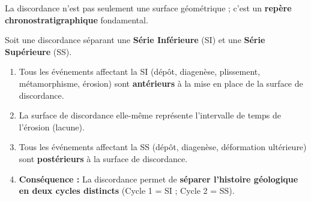 \documentclass[11pt]{article}
\begin{document}
La discordance n'est pas seulement une surface géométrique ; c'est un \textbf{repère chronostratigraphique} fondamental.

\begin{propriete}
Soit une discordance séparant une \textbf{Série Inférieure} (SI) et une \textbf{Série Supérieure} (SS).
\begin{enumerate}
    \item Tous les événements affectant la SI (dépôt, diagenèse, plissement, métamorphisme, érosion) sont \textbf{antérieurs} à la mise en place de la surface de discordance.
    \item La surface de discordance elle-même représente l'intervalle de temps de l'érosion (lacune).
    \item Tous les événements affectant la SS (dépôt, diagenèse, déformation ultérieure) sont \textbf{postérieurs} à la surface de discordance.
    \item \textbf{Conséquence :} La discordance permet de \textbf{séparer l'histoire géologique en deux cycles distincts} (Cycle 1 = SI ; Cycle 2 = SS).
\end{enumerate}
\end{propriete}
\end{document}
